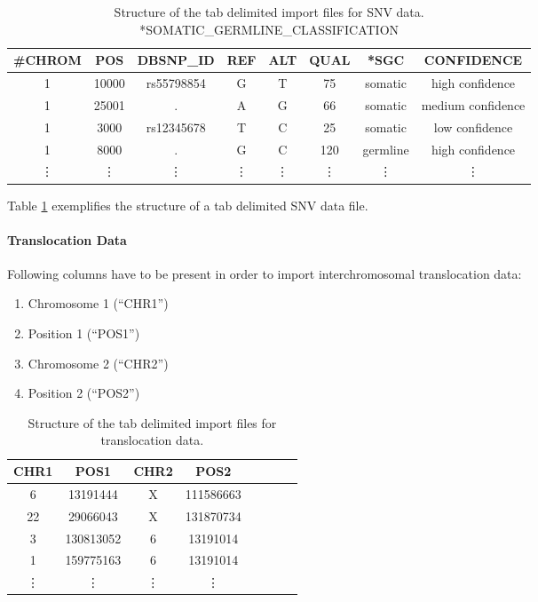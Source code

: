 \documentclass[11pt,final]{article}
\begin{document}
\begin{table}
	\centering
	\begin{tabular}[h]{|c|c|c|c|c|c|c|c|}
	  \hline
	  \#CHROM & POS & DBSNP\_ID & REF & ALT & QUAL & {*}SGC & CONFIDENCE \\ \hline
	 1 & 10000 & rs55798854 & G & T & 75 & somatic & high confidence\\
         1 & 25001 & . & A & G & 66 & somatic & medium confidence\\
         1 & 3000 & rs12345678 & T & C & 25 & somatic & low confidence\\
         1 & 8000 & . & G & C & 120 & germline & high confidence\\
	\vdots & \vdots & \vdots & \vdots & \vdots & \vdots & \vdots & \vdots \\
	\end{tabular}
	\caption{Structure of the tab delimited import files for SNV data.
	{*}SOMATIC\_GERMLINE\_CLASSIFICATION}
	\label{tab:tsv_snv}
\end{table}

Table \ref{tab:tsv_snv} exemplifies the structure of a tab delimited SNV data file.

\paragraph{Translocation Data}

Following columns have to be present in order to import interchromosomal
translocation data:

\begin{enumerate}
  \item Chromosome 1 (``CHR1'')
  \item Position 1 (``POS1'')
  \item Chromosome 2 (``CHR2'')
  \item Position 2 (``POS2'')
\end{enumerate}

\begin{table}
	\centering
	\begin{tabular}[h]{|c|c|c|c|c|c|c|c|}
	  \hline
	  CHR1 & POS1 & CHR2 & POS2 \\ \hline
	 6 & 13191444 & X & 111586663 \\
         22 & 29066043 & X & 131870734 \\
         3 & 130813052 & 6 & 13191014 \\
         1 & 159775163 & 6 & 13191014 \\
	 \vdots & \vdots & \vdots & \vdots \\
	\end{tabular}
	\caption{Structure of the tab delimited import files for translocation
	data.}
	\label{tab:tsv_transloc}
\end{table}
\end{document}
